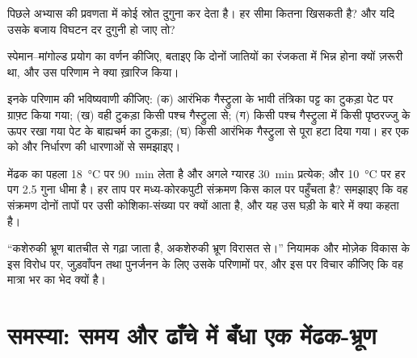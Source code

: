 \begin{exercise}[$\star\star$]\label{exo:b2:vertebrate-development:8}
पिछले अभ्यास की प्रवणता में कोई  स्रोत दुगुना कर देता है।
हर सीमा कितना खिसकती है? और यदि उसके बजाय विघटन दर
दुगुनी हो जाए तो?
\end{exercise}

\begin{exercise}[$\star\star$]\label{exo:b2:vertebrate-development:9}
स्पेमान--मांगोल्ड प्रयोग का वर्णन कीजिए, बताइए कि दोनों जातियों का
रंजकता में भिन्न होना क्यों ज़रूरी था, और उस परिणाम ने क्या ख़ारिज किया।
\end{exercise}

\begin{exercise}[$\star\star\star$]\label{exo:b2:vertebrate-development:10}
इनके परिणाम की भविष्यवाणी कीजिए: (क) आरंभिक गैस्ट्रुला के भावी
तंत्रिका पट्ट का टुकड़ा पेट पर ग्राफ़्ट किया गया; (ख) वही टुकड़ा किसी पश्च
गैस्ट्रुला से; (ग) किसी पश्च गैस्ट्रुला में किसी पृष्ठरज्जु के ऊपर
रखा गया पेट के बाह्यचर्म का टुकड़ा; (घ) किसी आरंभिक गैस्ट्रुला से पूरा
 हटा दिया गया। हर एक को  और
निर्धारण की धारणाओं से समझाइए।
\end{exercise}

\begin{exercise}[$\star\star\star$]\label{exo:b2:vertebrate-development:11}
मेंढक का पहला  \qty{18}{\celsius} पर \qty{90}{min} लेता है और
अगले ग्यारह \qty{30}{min} प्रत्येक; और \qty{10}{\celsius} पर हर
पग 2.5 गुना धीमा है। हर ताप पर मध्य-कोरकपुटी
संक्रमण किस काल पर पहुँचता है? समझाइए कि वह संक्रमण दोनों तापों पर
उसी कोशिका-संख्या पर क्यों आता है, और यह उस घड़ी के बारे में क्या
कहता है।
\end{exercise}

\begin{exercise}[$\star\star\star$]\label{exo:b2:vertebrate-development:12}
``कशेरुकी भ्रूण बातचीत से गढ़ा जाता है, अकशेरुकी भ्रूण विरासत से।''
नियामक और मोज़ेक विकास के इस विरोध पर, जुड़वाँपन तथा पुनर्जनन के लिए
उसके परिणामों पर, और इस पर विचार कीजिए कि वह मात्रा भर का भेद क्यों है।
\end{exercise}

\section{समस्या: समय और ढाँचे में बँधा एक मेंढक-भ्रूण}

